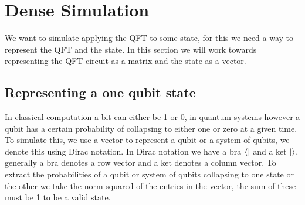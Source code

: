 \section{Dense Simulation}\label{sec:dense}
We want to simulate applying the QFT to some state, for this we need a way to represent the QFT and the state. 
In this section we will work towards representing the QFT circuit as a matrix and the state as a vector. 
\subsection{Representing a one qubit state}
In classical computation a bit can either be 1 or 0, in quantum systems however a qubit has a certain probability of collapsing to either one or zero at a given time.
To simulate this, we use a vector to represent a qubit or a system of qubits, we denote this using Dirac notation. In Dirac notation we have a bra $\bra{}$ and a ket $\ket{}$, generally a bra denotes a row vector and a ket denotes a column vector.
To extract the probabilities of a qubit or system of qubits collapsing to one state or the other we take the norm squared of the entries in the vector, the sum of these must be 1 to be a valid state.
\newcommand{\qo}{\begin{bmatrix}
        0\\
        1\\
    \end{bmatrix}}
\newcommand{\qz}{\begin{bmatrix}
        1\\
        0\\
    \end{bmatrix}}
\newcommand{\qp}{\begin{bmatrix}
        \sqrt{0.5}\\
        \sqrt{0.5}\\
    \end{bmatrix}}
\newcommand{\qm}{\begin{bmatrix}
        \sqrt{0.5}\\
        -\sqrt{0.5}\\
    \end{bmatrix}}
    
